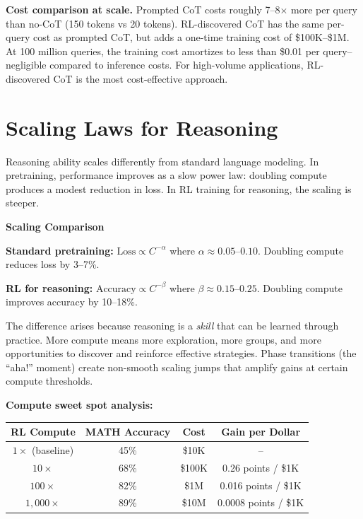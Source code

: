 \begin{chapterenv}
\begin{tipbox}
\textbf{Cost comparison at scale.} Prompted CoT costs roughly 7--8$\times$ more per query than no-CoT (150 tokens vs 20 tokens). RL-discovered CoT has the same per-query cost as prompted CoT, but adds a one-time training cost of \$100K--\$1M. At 100 million queries, the training cost amortizes to less than \$0.01 per query--negligible compared to inference costs. For high-volume applications, RL-discovered CoT is the most cost-effective approach.
\end{tipbox}

\section{Scaling Laws for Reasoning}

Reasoning ability scales differently from standard language modeling. In pretraining, performance improves as a slow power law: doubling compute produces a modest reduction in loss. In RL training for reasoning, the scaling is steeper.

\begin{infobox}
\textbf{Scaling Comparison}

\textbf{Standard pretraining:} $\text{Loss} \propto C^{-\alpha}$ where $\alpha \approx 0.05$--$0.10$. Doubling compute reduces loss by 3--7\%.

\textbf{RL for reasoning:} $\text{Accuracy} \propto C^{-\beta}$ where $\beta \approx 0.15$--$0.25$. Doubling compute improves accuracy by 10--18\%.

The difference arises because reasoning is a \textit{skill} that can be learned through practice. More compute means more exploration, more groups, and more opportunities to discover and reinforce effective strategies. Phase transitions (the ``aha!'' moment) create non-smooth scaling jumps that amplify gains at certain compute thresholds.
\end{infobox}

\textbf{Compute sweet spot analysis:}

\begin{center}
\begin{tabular}{cccc}
\toprule
\textbf{RL Compute} & \textbf{MATH Accuracy} & \textbf{Cost} & \textbf{Gain per Dollar} \\
\midrule
$1\times$ (baseline) & 45\% & \$10K & -- \\
$10\times$ & 68\% & \$100K & 0.26 points / \$1K \\
$100\times$ & 82\% & \$1M & 0.016 points / \$1K \\
$1{,}000\times$ & 89\% & \$10M & 0.0008 points / \$1K \\
\bottomrule
\end{tabular}
\end{center}


\end{chapterenv}
